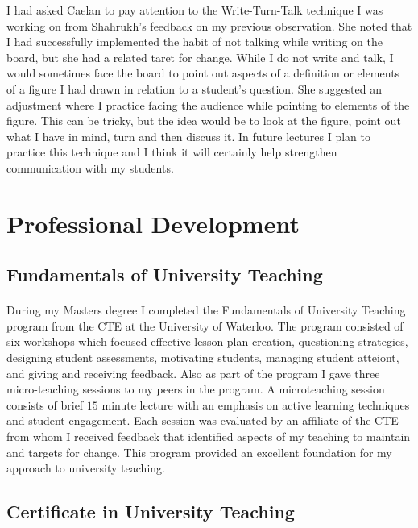 \documentclass{article}
\begin{document}
I had asked Caelan to pay attention to the Write-Turn-Talk technique I was working on from Shahrukh's feedback on my previous observation. She noted that I had successfully implemented the habit of not talking while writing on the board, but she had a related taret for change. While I do not write and talk, I would sometimes face the board to point out aspects of a definition or elements of a figure I had drawn in relation to a student's question. She suggested an adjustment where I practice facing the audience while pointing to elements of the figure. This can be tricky, but the idea would be to look at the figure, point out what I have in mind, turn and then discuss it. In future lectures I plan to practice this technique and I think it will certainly help strengthen communication with my students.

\section{Professional Development}
\subsection{Fundamentals of University Teaching}
\paragraph{}
During my Masters degree I completed the Fundamentals of University Teaching program from the CTE at the University of Waterloo. The program consisted of six workshops which focused effective lesson plan creation, questioning strategies, designing student assessments, motivating students, managing student atteiont, and giving and receiving feedback. Also as part of the program I gave three micro-teaching sessions to my peers in the program. A microteaching session consists of brief $15$ minute lecture with an emphasis on active learning techniques and student engagement. Each session was evaluated by an affiliate of the CTE from whom I received feedback that identified aspects of my teaching to maintain and targets for change. This program provided an excellent foundation for my approach to university teaching.

\subsection{Certificate in University Teaching}
\end{document}

